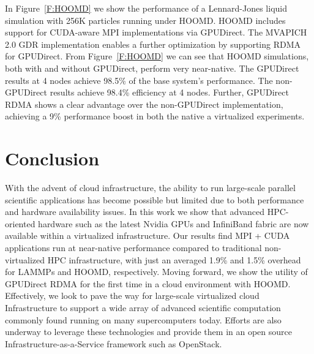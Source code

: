In Figure~\ref{F:HOOMD} we show the performance of a Lennard-Jones liquid
simulation with 256K particles running under HOOMD.  HOOMD includes support for
CUDA-aware MPI implementations via GPUDirect.  The MVAPICH 2.0 GDR
implementation enables a further optimization by supporting RDMA for GPUDirect.
From Figure~\ref{F:HOOMD} we can see that HOOMD simulations, both with and
without GPUDirect, perform very near-native.  The GPUDirect results at 4 nodes
achieve 98.5\% of the base system's performance.  The non-GPUDirect results
achieve 98.4\% efficiency at 4 nodes.  Further, GPUDirect RDMA shows a clear advantage over the non-GPUDirect
implementation, achieving a 9\% performance boost in both the native a
virtualized experiments.



\section{Conclusion}

With the advent of cloud infrastructure, the ability to run large-scale parallel scientific applications has become possible but limited due to both performance and hardware availability issues. In this work we show that advanced HPC-oriented hardware such as the latest Nvidia GPUs and InfiniBand fabric are now available within a virtualized infrastructure. Our results find MPI + CUDA applications run at near-native performance compared to traditional non-virtualized HPC infrastructure, with just an averaged 1.9\% and 1.5\% overhead for LAMMPs and HOOMD, respectively. Moving forward, we show the utility of GPUDirect RDMA for the first time in a cloud environment with HOOMD.  Effectively, we look to pave the way for large-scale virtualized cloud Infrastructure to support a wide array of advanced scientific computation commonly found running on many supercomputers today.  Efforts are also underway to leverage these technologies and provide them in an open source Infrastructure-as-a-Service framework such as OpenStack.  
